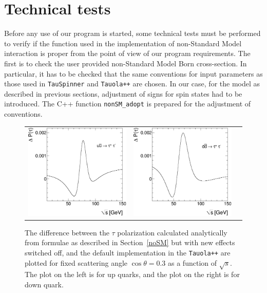 \documentclass[12pt]{article}
\begin{document}
\section{Technical tests}

Before any use of our program is started, some technical tests must be performed
to verify if the function used in the implementation of non-Standard Model
interaction is proper from the point of view of our program requirements.
The first  is to check  the user provided  non-Standard Model Born cross-section. 
In particular, it has to be checked that the same conventions for input parameters as those used in {\tt TauSpinner} and  {\tt Tauola++} are chosen.
In our case, for the model as described in  previous sections, adjustment of signs for spin states had to be introduced.
The C++ function {\tt nonSM{\_}adopt} is prepared for the adjustment of conventions.

\begin{figure}[htp!]
\begin{tabular}{ccc}
  \includegraphics[width=0.48\columnwidth]{test1_up.eps} &
  \includegraphics[width=0.48\columnwidth]{test1_down.eps} 
\end{tabular}
\caption{
The  difference between the $\tau$ polarization calculated  analytically 
from formulae as described in Section~\ref{noSM} but with new effects switched off, 
and the default implementation in the {\tt Tauola++} are plotted for 
fixed  scattering angle  $\cos\theta=0.3$ as a function of $\sqrt{s}$.
The plot on the left is for up quarks, and the plot on the right is for down quark. 
\label{figTest1}}
\end{figure}
\end{document}
